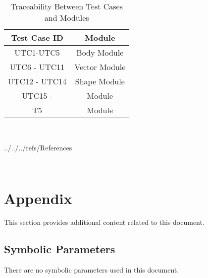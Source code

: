 \documentclass[12pt, titlepage]{article}
\begin{document}
\begin{table} [h!]
	
	\centering
	
	\begin{tabular}{|c|c|}
		
		\hline	
		
		\textbf{Test Case ID} & \textbf{Module}\\
		
		\hline 
		
	
		UTC1-UTC5& Body Module\\ \hline
		
		UTC6 - UTC11& Vector  Module\\ \hline
		
		UTC12 - UTC14&  Shape Module\\ \hline
		
		UTC15 - & Module\\ \hline
		
		T5& Module\\ \hline
		
	\end{tabular}
	
	\caption{Traceability Between Test Cases and Modules}
	
	\label{Table:Traceability} 
	
\end{table}

~\newpage


 {../../../refs/References}

~\newpage



\section{Appendix}



This section provides additional content related to this document.



\subsection{Symbolic Parameters}



There are no symbolic parameters used in this document.
\end{document}
